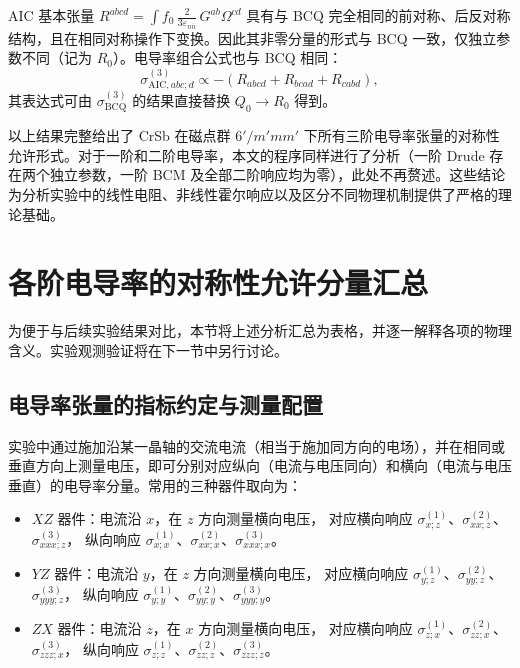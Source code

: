 AIC 基本张量 \(R^{abcd} = \int f_0\,\frac{2}{3\varepsilon_{n\bar{n}}}\,G^{ab}\Omega^{cd}\) 具有与 BCQ 完全相同的前对称、后反对称结构，且在相同对称操作下变换。因此其非零分量的形式与 BCQ 一致，仅独立参数不同（记为 \(R_{0}\)）。电导率组合公式也与 BCQ 相同：
\begin{equation}
  \sigma^{(3)}_{\mathrm{AIC}, abc;d} \propto -(R_{abcd}+R_{bcad}+R_{cabd}),
\end{equation}
其表达式可由 \(\sigma^{(3)}_{\mathrm{BCQ}}\) 的结果直接替换 \(Q_{0}\to R_{0}\) 得到。

以上结果完整给出了 CrSb 在磁点群 \(6'/m'mm'\) 下所有三阶电导率张量的对称性允许形式。对于一阶和二阶电导率，本文的程序同样进行了分析（一阶 Drude 存在两个独立参数，一阶 BCM 及全部二阶响应均为零），此处不再赘述。这些结论为分析实验中的线性电阻、非线性霍尔响应以及区分不同物理机制提供了严格的理论基础。

\section{各阶电导率的对称性允许分量汇总}

为便于与后续实验结果对比，本节将上述分析汇总为表格，并逐一解释各项的物理含义。实验观测验证将在下一节中另行讨论。

\subsection{电导率张量的指标约定与测量配置}
实验中通过施加沿某一晶轴的交流电流（相当于施加同方向的电场），并在相同或垂直方向上测量电压，即可分别对应纵向（电流与电压同向）和横向（电流与电压垂直）的电导率分量。常用的三种器件取向为：
\begin{itemize}
\item \(XZ\) 器件：电流沿 \(x\)，在 \(z\) 方向测量横向电压，
  对应横向响应 \(\sigma^{(1)}_{x;z}\)、\(\sigma^{(2)}_{xx;z}\)、\(\sigma^{(3)}_{xxx;z}\)，
  纵向响应 \(\sigma^{(1)}_{x;x}\)、\(\sigma^{(2)}_{xx;x}\)、\(\sigma^{(3)}_{xxx;x}\)。
\item \(YZ\) 器件：电流沿 \(y\)，在 \(z\) 方向测量横向电压，
  对应横向响应 \(\sigma^{(1)}_{y;z}\)、\(\sigma^{(2)}_{yy;z}\)、\(\sigma^{(3)}_{yyy;z}\)，
  纵向响应 \(\sigma^{(1)}_{y;y}\)、\(\sigma^{(2)}_{yy;y}\)、\(\sigma^{(3)}_{yyy;y}\)。
\item \(ZX\) 器件：电流沿 \(z\)，在 \(x\) 方向测量横向电压，
  对应横向响应 \(\sigma^{(1)}_{z;x}\)、\(\sigma^{(2)}_{zz;x}\)、\(\sigma^{(3)}_{zzz;x}\)，
  纵向响应 \(\sigma^{(1)}_{z;z}\)、\(\sigma^{(2)}_{zz;z}\)、\(\sigma^{(3)}_{zzz;z}\)。
\end{itemize}
